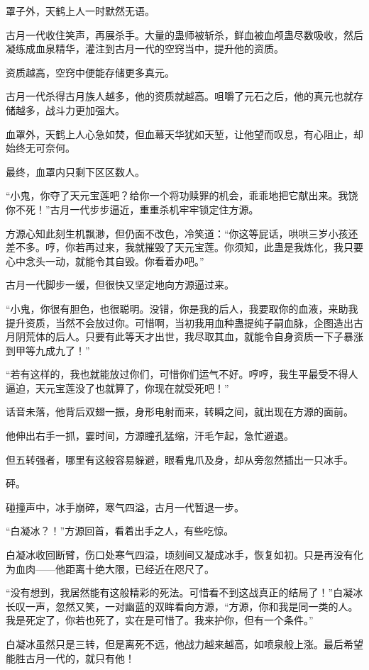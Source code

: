 \begin{this_body}
罩子外，天鹤上人一时默然无语。

古月一代收住笑声，再展杀手。大量的蛊师被斩杀，鲜血被血颅蛊尽数吸收，然后凝练成血泉精华，灌注到古月一代的空窍当中，提升他的资质。

资质越高，空窍中便能存储更多真元。

古月一代杀得古月族人越多，他的资质就越高。咀嚼了元石之后，他的真元也就存储越多，战斗力更加强大。

血罩外，天鹤上人心急如焚，但血幕天华犹如天堑，让他望而叹息，有心阻止，却始终无可奈何。

最终，血罩内只剩下区区数人。

“小鬼，你夺了天元宝莲吧？给你一个将功赎罪的机会，乖乖地把它献出来。我饶你不死！”古月一代步步逼近，重重杀机牢牢锁定住方源。

方源心知此刻生机飘渺，但仍面不改色，冷笑道：“你这等屁话，哄哄三岁小孩还差不多。哼，你若再过来，我就摧毁了天元宝莲。你须知，此蛊是我炼化，我只要心中念头一动，就能令其自毁。你看着办吧。”

古月一代脚步一缓，但很快又坚定地向方源逼过来。

“小鬼，你很有胆色，也很聪明。没错，你是我的后人，我要取你的血液，来助我提升资质，当然不会放过你。可惜啊，当初我用血种蛊提纯子嗣血脉，企图造出古月阴荒体的后人。只要有此等天才出世，我尽取其血，就能令自身资质一下子暴涨到甲等九成九了！”

“若有这样的，我也就能放过你们，可惜你们运气不好。哼哼，我生平最受不得人逼迫，天元宝莲没了也就算了，你现在就受死吧！”

话音未落，他背后双翅一振，身形电射而来，转瞬之间，就出现在方源的面前。

他伸出右手一抓，霎时间，方源瞳孔猛缩，汗毛乍起，急忙避退。

但五转强者，哪里有这般容易躲避，眼看鬼爪及身，却从旁忽然插出一只冰手。

砰。

碰撞声中，冰手崩碎，寒气四溢，古月一代暂退一步。

“白凝冰？！”方源回首，看着出手之人，有些吃惊。

白凝冰收回断臂，伤口处寒气四溢，顷刻间又凝成冰手，恢复如初。只是再没有化为血肉——他距离十绝大限，已经近在咫尺了。

“没有想到，我居然能有这般精彩的死法。可惜看不到这战真正的结局了！”白凝冰长叹一声，忽然又笑，一对幽蓝的双眸看向方源，“方源，你和我是同一类的人。我是死定了，你若也死了，实在是可惜了。我来护你，但有一个条件。”

白凝冰虽然只是三转，但是离死不远，他战力越来越高，如喷泉般上涨。最后希望能胜古月一代的，就只有他！


\end{this_body}
